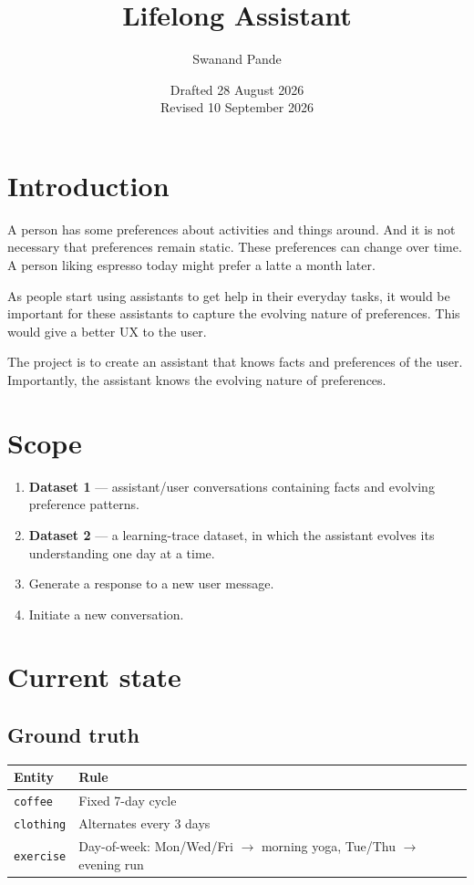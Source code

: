 \documentclass[11pt]{article}
\title{Lifelong Assistant}
\author{Swanand Pande}
\date{Drafted 28 August 2026 \\ Revised 10 September 2026}
\begin{document}
\maketitle


\section{Introduction}

A person has some preferences about activities and things around. And it is not necessary that preferences remain static. These preferences can change over time. A person liking espresso today might prefer a latte a month later. 

As people start using assistants to get help in their everyday tasks, it would be important for these assistants to capture the evolving nature of preferences. This would give a better UX to the user.

The project is to create an assistant that knows facts and preferences of the user. Importantly, the assistant knows the evolving nature of preferences. 

\section{Scope}

\begin{enumerate}[itemsep=2pt, topsep=4pt]
  \item \textbf{Dataset 1} --- assistant/user conversations containing facts and
        evolving preference patterns.
  \item \textbf{Dataset 2} --- a learning-trace dataset, in which the assistant evolves
        its understanding one day at a time.
  \item Generate a response to a new user message.
  \item Initiate a new conversation.
\end{enumerate}

\section{Current state}

\subsection{Ground truth}

\begin{table}[h]
\centering
\begin{tabularx}{\textwidth}{@{}l L@{}}
\toprule
\textbf{Entity} & \textbf{Rule} \\
\midrule
\texttt{coffee}   & Fixed 7-day cycle \\
\texttt{clothing} & Alternates every 3 days \\
\texttt{exercise} & Day-of-week: Mon/Wed/Fri $\to$ morning yoga,
                    Tue/Thu $\to$ evening run \\
\bottomrule
\end{tabularx}
\end{table}
\end{document}

